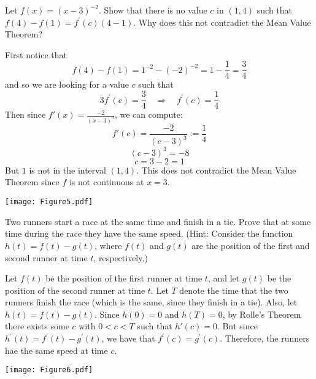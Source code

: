\documentclass[handout,nooutcomes]{ximera}
\begin{document}
\begin{problem}
Let $f(x) = (x-3)^{-2}$.  Show that there is no value $c$ in $(1,4)$ such that $f(4) - f(1) = f^{\prime}(c) (4-1)$.  Why does this not contradict the Mean Value Theorem?
		\begin{freeResponse}
		First notice that 
		$$f(4)-f(1) = 1^{-2} - (-2)^{-2} = 1-\frac{1}{4} = \frac{3}{4}$$
		and so we are looking for a value $c$ such that 
		$$3 f^\prime (c) = \frac{3}{4} \quad \Longrightarrow \quad f^\prime (c) = \frac{1}{4} $$
		Then since $f'(x) = \frac{-2}{(x-3)^3}$, we can compute:
		$$ f'(c) = \frac{-2}{(c-3)^3} := \frac{1}{4}$$
		$$ (c-3)^3 = - 8 $$
		$$ c = 3 - 2 = 1 $$
		But $1$ is not in the interval $(1,4)$.  This does not contradict the Mean Value Theorem since $f$ is not continuous at $x=3$.
		
		\begin{image}
		\texttt{[image: Figure5.pdf]}
		\end{image}
		
		\end{freeResponse}
			
			
		
\end{problem}















\begin{problem}
Two runners start a race at the same time and finish in a tie.  Prove that at some time during the race they have the same speed.  (Hint:  Consider the function $h(t)=f(t)-g(t)$, where $f(t)$ and $g(t)$ are the position of the first and second runner at time $t$, respectively.)
		\begin{freeResponse}
		Let $f(t)$ be the position of the first runner at time $t$, and let $g(t)$ be the position of the second runner at time $t$.  Let $T$ denote the time that the two runners finish the race (which is the same, since they finish in a tie).  Also, let $h(t) = f(t) - g(t)$.  Since $h(0) = 0$ and $h(T) = 0$, by Rolle's Theorem there exists some $c$ with $0 < c < T$ such that $h'(c)=0$.  But since $h^\prime (t) = f^\prime (t) - g^\prime (t)$, we have that $f^\prime (c) = g^\prime (c)$.  Therefore, the runners hae the same speed at time $c$.  
		
		\begin{image}
		\texttt{[image: Figure6.pdf]}
		\end{image}
		
		\end{freeResponse}
			
			
	
\end{problem}






	
	
	
	
	
	
	
	
	

	










								
				
				
	
\end{document}
